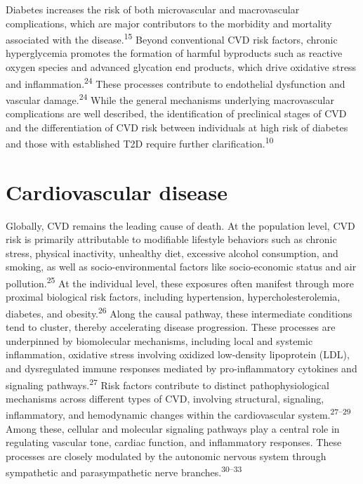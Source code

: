 \documentclass[
  letterpaper,
  headsepline=true,
  open=any]{scrbook}
\begin{document}
Diabetes increases the risk of both microvascular and macrovascular
complications, which are major contributors to the morbidity and
mortality associated with the disease.\textsuperscript{15} Beyond
conventional CVD risk factors, chronic hyperglycemia promotes the
formation of harmful byproducts such as reactive oxygen species and
advanced glycation end products, which drive oxidative stress and
inflammation.\textsuperscript{24} These processes contribute to
endothelial dysfunction and vascular damage.\textsuperscript{24} While
the general mechanisms underlying macrovascular complications are well
described, the identification of preclinical stages of CVD and the
differentiation of CVD risk between individuals at high risk of diabetes
and those with established T2D require further
clarification.\textsuperscript{10}

\hypertarget{cardiovascular-disease}{%
\section{Cardiovascular disease}\label{cardiovascular-disease}}

Globally, CVD remains the leading cause of death. At the population
level, CVD risk is primarily attributable to modifiable lifestyle
behaviors such as chronic stress, physical inactivity, unhealthy diet,
excessive alcohol consumption, and smoking, as well as
socio-environmental factors like socio-economic status and air
pollution.\textsuperscript{25} At the individual level, these exposures
often manifest through more proximal biological risk factors, including
hypertension, hypercholesterolemia, diabetes, and
obesity.\textsuperscript{26} Along the causal pathway, these
intermediate conditions tend to cluster, thereby accelerating disease
progression. These processes are underpinned by biomolecular mechanisms,
including local and systemic inflammation, oxidative stress involving
oxidized low-density lipoprotein (LDL), and dysregulated immune
responses mediated by pro-inflammatory cytokines and signaling
pathways.\textsuperscript{27} Risk factors contribute to distinct
pathophysiological mechanisms across different types of CVD, involving
structural, signaling, inflammatory, and hemodynamic changes within the
cardiovascular system.\textsuperscript{27--29} Among these, cellular and
molecular signaling pathways play a central role in regulating vascular
tone, cardiac function, and inflammatory responses. These processes are
closely modulated by the autonomic nervous system through sympathetic
and parasympathetic nerve branches.\textsuperscript{30--33}
\end{document}
